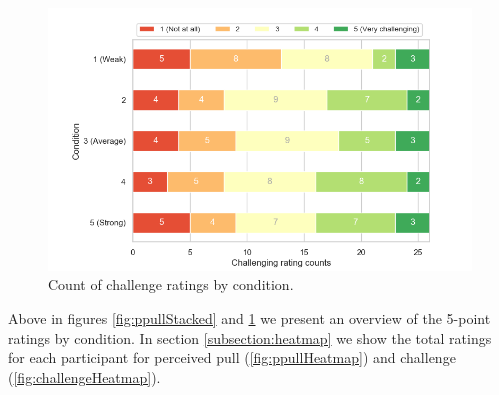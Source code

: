 \begin{figure}[H]
\captionsetup{justification=centering,margin=0.1cm}
 \centering
 \hspace{-20mm}
\includegraphics[scale=0.7]{Files/Plots/challenge_by_condition_count_staked.png}
\caption{Count of challenge ratings by condition.}
\label{fig:challengeStacked}
\end{figure}

\clearpage
Above in figures \ref{fig:ppullStacked} and 
\ref{fig:challengeStacked} we present an overview of the 5-point ratings by condition. In section \ref{subsection:heatmap} we show the total ratings for each participant for perceived pull (\ref{fig:ppullHeatmap}) and challenge (\ref{fig:challengeHeatmap}).

    
